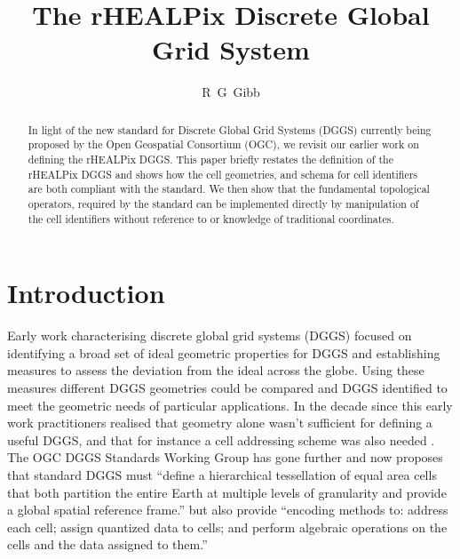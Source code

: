 \documentclass[12pt]{iopart}
\begin{document}
\pagestyle{empty}

\title{The rHEALPix Discrete Global Grid System}

\author{R~G~Gibb}

\address{Informatics Team Leader, Landcare Research, Private~Bag~11052, Palmerston~North~4442, New~Zealand}


\begin{abstract}
In light of the new standard for Discrete Global Grid Systems (DGGS) currently being proposed by the Open Geospatial Consortium (OGC), we revisit our earlier work on defining the rHEALPix DGGS. This paper briefly restates the definition of the rHEALPix DGGS and shows  how the cell geometries, and schema for cell identifiers are both compliant with the standard. We then show that the fundamental topological operators, required by the standard can be implemented directly by manipulation of the cell identifiers without reference to or knowledge of traditional coordinates.
\end{abstract}

\section{Introduction}\label{sec:introduction}
Early work characterising discrete global grid systems (DGGS) \citep{KSWS1999, SWK2003} focused on identifying a broad set of ideal geometric properties for DGGS and establishing measures to assess the deviation from the ideal across the globe. Using these measures different DGGS geometries could be compared and DGGS identified to meet the geometric needs of particular applications. In the decade since this early work practitioners realised that geometry alone wasn't sufficient for defining a useful DGGS, and that for instance a cell addressing scheme was also needed \citep{GiRa2013}.  The OGC DGGS Standards Working Group \citep{PGP2014} has gone further and now proposes that standard DGGS must ``define a hierarchical tessellation of equal area cells that both partition the entire Earth at multiple levels of granularity and provide a global spatial reference frame.'' but also provide ``encoding methods to: address each cell; assign quantized data to cells; and perform algebraic operations on the cells and the data assigned to them.''
\end{document}
